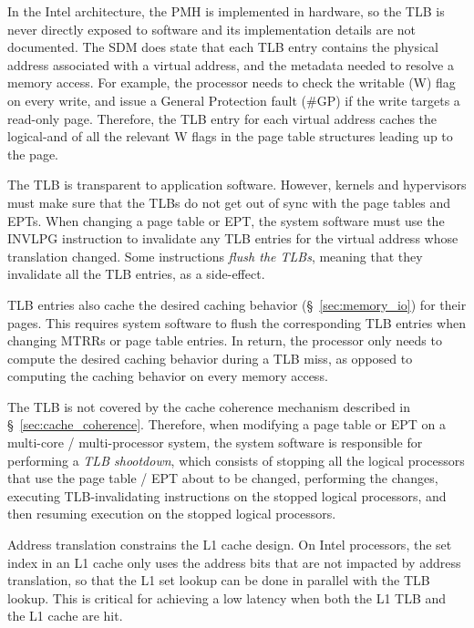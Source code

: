 
In the Intel architecture, the PMH is implemented in hardware, so the TLB is
never directly exposed to software and its implementation details are not
documented.  The SDM does state that each TLB entry contains the physical
address associated with a virtual address, and the metadata needed to resolve a
memory access. For example, the processor needs to check the writable (W) flag
on every write, and issue a General Protection fault (\#GP) if the write
targets a read-only page.  Therefore, the TLB entry for each virtual address
caches the logical-and of all the relevant W flags in the page table structures
leading up to the page.

The TLB is transparent to application software. However, kernels and
hypervisors must make sure that the TLBs do not get out of sync with the page
tables and EPTs. When changing a page table or EPT, the system software must
use the INVLPG instruction to invalidate any TLB entries for the virtual
address whose translation changed. Some instructions \textit{flush the TLBs},
meaning that they invalidate all the TLB entries, as a side-effect.


TLB entries also cache the desired caching behavior (\S~\ref{sec:memory_io})
for their pages. This requires system software to flush the corresponding TLB
entries when changing MTRRs or page table entries. In return, the processor
only needs to compute the desired caching behavior during a TLB miss, as
opposed to computing the caching behavior on every memory access.


The TLB is not covered by the cache coherence mechanism described in
\S~\ref{sec:cache_coherence}. Therefore, when modifying a page table or EPT on
a multi-core / multi-processor system, the system software is responsible for
performing a \textit{TLB shootdown}, which consists of stopping all the logical
processors that use the page table / EPT about to be changed, performing the
changes, executing TLB-invalidating instructions on the stopped logical
processors, and then resuming execution on the stopped logical processors.

Address translation constrains the L1 cache design. On Intel processors, the
set index in an L1 cache only uses the address bits that are not impacted by
address translation, so that the L1 set lookup can be done in parallel with the
TLB lookup. This is critical for achieving a low latency when both the L1 TLB
and the L1 cache are hit.

